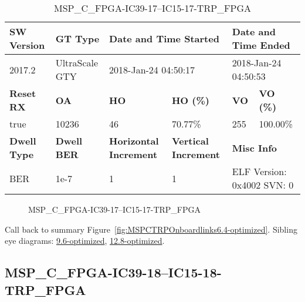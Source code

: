 \begin{table}[h]
\centering
\caption{MSP\_C\_FPGA-IC39-17--IC15-17-TRP\_FPGA}
\label{tab:MSPCFPGAIC3917IC1517TRPFPGA6.4-optimized}
\begin{tabular}{@{}|l|l|l|l|l|l|@{}}
\toprule
\textbf{SW Version}                & \textbf{GT Type}   & \multicolumn{2}{l|}{\textbf{Date and Time Started}}            & \multicolumn{2}{l|}{\textbf{Date and Time Ended}}        \\ \midrule
2017.2                       & UltraScale GTY          & \multicolumn{2}{l|}{2018-Jan-24 04:50:17}                   & \multicolumn{2}{l|}{2018-Jan-24 04:50:53}               \\ \midrule
\textbf{Reset RX}                  & \textbf{OA} & \textbf{HO}   & \textbf{HO (\%)} & \textbf{VO} & \textbf{VO (\%)} \\ \midrule
true & 10236        & 46          & 70.77\%        & 255        & 100.00\%       \\ \midrule
\textbf{Dwell Type}                & \textbf{Dwell BER} & \textbf{Horizontal Increment} & \textbf{Vertical Increment}    & \multicolumn{2}{l|}{\textbf{Misc Info}}                  \\ \midrule
BER                            & 1e-7        & 1        & 1           & \multicolumn{2}{l|}{ELF Version: 0x4002 SVN: 0}                         \\ \bottomrule
\end{tabular}
\end{table}

\begin{figure}[h]
\caption{MSP\_C\_FPGA-IC39-17--IC15-17-TRP\_FPGA} \label{fig:MSPCFPGAIC3917IC1517TRPFPGA6.4-optimized}
\end{figure}

Call back to summary Figure~\ref{fig:MSPCTRPOnboardlinks6.4-optimized}.
Sibling eye diagrams: \hyperref[sec:MSPCFPGAIC3917IC1517TRPFPGA9.6-optimized]{9.6-optimized}, \hyperref[sec:MSPCFPGAIC3917IC1517TRPFPGA12.8-optimized]{12.8-optimized}.

\clearpage
\newpage


\subsection{MSP\_C\_FPGA-IC39-18--IC15-18-TRP\_FPGA}\label{sec:MSPCFPGAIC3918IC1518TRPFPGA6.4-optimized}


